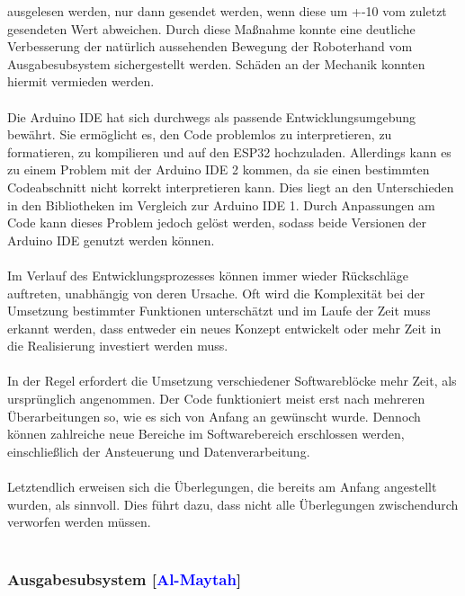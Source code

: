 \documentclass[titlepage,12pt,twoside]{article}
\begin{document}
ausgelesen werden, nur dann gesendet werden, wenn diese um +-10 vom zuletzt 
gesendeten Wert abweichen. Durch diese Maßnahme konnte eine deutliche 
Verbesserung der natürlich aussehenden Bewegung der Roboterhand vom 
Ausgabesubsystem sichergestellt werden. Schäden an der Mechanik konnten hiermit vermieden werden. \\
\\
Die Arduino IDE hat sich durchwegs als passende Entwicklungsumgebung bewährt. 
Sie ermöglicht es, den Code problemlos zu interpretieren, zu formatieren, zu 
kompilieren und auf den ESP32 hochzuladen. Allerdings kann es zu einem Problem 
mit der Arduino IDE 2 kommen, da sie einen bestimmten Codeabschnitt nicht 
korrekt interpretieren kann. Dies liegt an den Unterschieden in den Bibliotheken 
im Vergleich zur Arduino IDE 1. Durch Anpassungen am Code kann dieses Problem 
jedoch gelöst werden, sodass beide Versionen der Arduino IDE genutzt werden 
können. \\
\\
Im Verlauf des Entwicklungsprozesses können immer wieder Rückschläge auftreten, 
unabhängig von deren Ursache. Oft wird die Komplexität bei der Umsetzung 
bestimmter Funktionen unterschätzt und im Laufe der Zeit muss erkannt werden, 
dass entweder ein neues Konzept entwickelt oder mehr Zeit in die Realisierung 
investiert werden muss. \\
\\
In der Regel erfordert die Umsetzung verschiedener Softwareblöcke mehr Zeit, 
als ursprünglich angenommen. Der Code funktioniert meist erst nach mehreren 
Überarbeitungen so, wie es sich von Anfang an gewünscht wurde. Dennoch können 
zahlreiche neue Bereiche im Softwarebereich erschlossen werden, einschließlich 
der Ansteuerung und Datenverarbeitung. \\
\\
Letztendlich erweisen sich die Überlegungen, die bereits am Anfang angestellt 
wurden, als sinnvoll. Dies führt dazu, dass nicht alle Überlegungen 
zwischendurch verworfen werden müssen. \\
\\

\subsubsection{Ausgabesubsystem [\textcolor{blue}{Al-Maytah}]}
\end{document}
